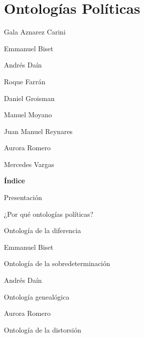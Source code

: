 



\ifPDF

\usepackage[hyphenation,homeoarchy,homeoarchywordcolor=orange, homeoarchycharcolor=orange,draft]{impnattypo}
\usepackage[allcolors=magenta, colorlinks, unicode]{hyperref}
\usepackage{easyReview}
\usepackage{hyperxmp}

	\else
	\ifBNPDF
	\usepackage[width=18truecm,height=25.5truecm,cam,center]{crop}
	\newcommand*\infofont[1]{\sf{\footnotesize #1 (alberto.alejandro.moyano@gmail.com)}}
	\crop[font=infofont]
	\usepackage[hidelinks, unicode]{hyperref}
	\usepackage{hyperxmp}
	
		\else
		\ifPNGEPUB
		\usepackage[hidelinks, unicode]{hyperref}
			\else
			\ifHTMLEPUB
			\usepackage[allcolors=blue,colorlinks,hyperindex=true,unicode]{hyperref}
			\fi
		\fi
	\fi
\fi



\section{Ontologías Políticas}

Gala Aznarez Carini

Emmanuel Biset

Andrés Daín

Roque Farrán

Daniel Groisman

Manuel Moyano

Juan Manuel Reynares

Aurora Romero

Mercedes Vargas

\textbf{Índice}

Presentación

¿Por qué ontologías políticas?

Ontología de la diferencia

Emmanuel Biset

Ontología de la sobredeterminación

Andrés Daín

Ontología genealógica

Aurora Romero

Ontología de la distorsión

